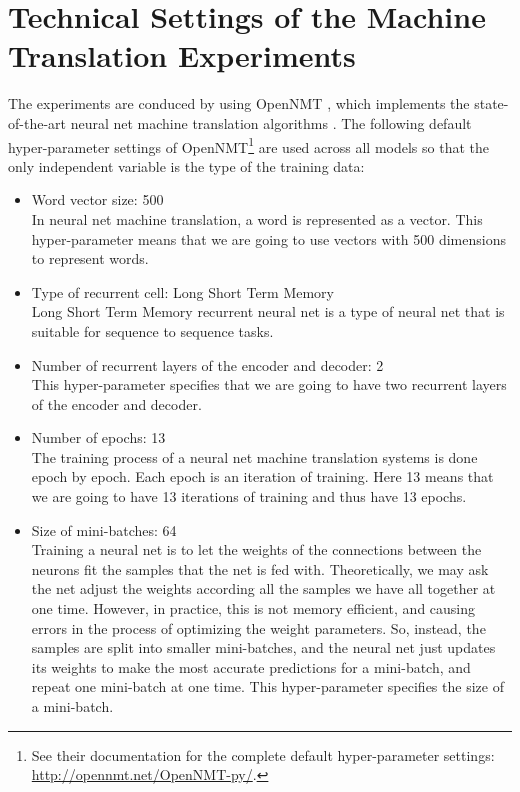 \documentclass[final]{ua-thesis}
\numberwithin{equation}{section}
\begin{document}
\section{Technical Settings of the Machine Translation Experiments}\label{sec:experimet_setting}
The experiments are conduced by using OpenNMT \citep{2017opennmt}, which implements the state-of-the-art neural net machine translation algorithms \citep{cho2014properties, cho2014learning, bahdanau2014neural}.
The following default hyper-parameter settings of OpenNMT\footnote{See their documentation for the complete default hyper-parameter settings: \url{http://opennmt.net/OpenNMT-py/}.} are used across all models so that the only independent variable is the type of the training data:
	\begin{itemize}
	\item Word vector size: 500\\
	In neural net machine translation, a word is represented as a vector. This hyper-parameter means that we are going to use vectors with 500 dimensions to represent words.
	\item Type of recurrent cell: Long Short Term Memory\\
	Long Short Term Memory recurrent neural net is a type of neural net that is suitable for sequence to sequence tasks.  
	\item Number of recurrent layers of the encoder and decoder: 2\\
	This hyper-parameter specifies that we are going to have two recurrent layers of the encoder and decoder. 
	\item Number of epochs: 13\\
	The training process of a neural net machine translation systems is done epoch by epoch. Each epoch is an iteration of training. Here 13 means that we are going to have 13 iterations of training and thus have 13 epochs. 
	\item Size of mini-batches: 64\\
	Training a neural net is to let the weights of the connections between the neurons fit the samples that the net is fed with. Theoretically, we may ask the net adjust the weights according all the samples we have all together at one time. However, in practice, this is not memory efficient, and causing errors in the process of optimizing the weight parameters. So, instead, the samples are split into smaller mini-batches, and the neural net just updates its weights to make the most accurate predictions for a mini-batch, and repeat one mini-batch at one time. This hyper-parameter specifies the size of a mini-batch.  
	\end{itemize}
\end{document}
